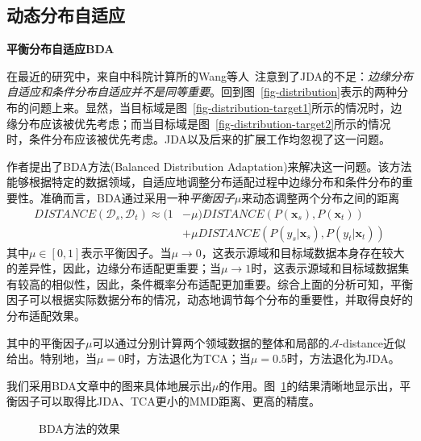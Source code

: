 \subsection{动态分布自适应}

\textbf{平衡分布自适应BDA}

在最近的研究中，来自中科院计算所的Wang等人~\cite{wang2017balanced}注意到了JDA的不足：\textit{边缘分布自适应和条件分布自适应并不是同等重要}。回到图~\ref{fig-distribution}表示的两种分布的问题上来。显然，当目标域是图~\ref{fig-distribution-target1}所示的情况时，边缘分布应该被优先考虑；而当目标域是图~\ref{fig-distribution-target2}所示的情况时，条件分布应该被优先考虑。JDA以及后来的扩展工作均忽视了这一问题。

作者提出了BDA方法(Balanced Distribution Adaptation)来解决这一问题。该方法能够根据特定的数据领域，自适应地调整分布适配过程中边缘分布和条件分布的重要性。准确而言，BDA通过采用一种\textit{平衡因子}$\mu$来动态调整两个分布之间的距离
\begin{equation}
\label{equ-mummd}
\begin{split}
DISTANCE(\mathcal{D}_s,\mathcal{D}_t) \approx  (1 &- \mu)DISTANCE(P(\mathbf{x}_s),P(\mathbf{x}_t))\\
&+ \mu DISTANCE(P(y_s|\mathbf{x}_s),P(y_t|\mathbf{x}_t))
\end{split}
\end{equation}
其中$\mu \in [0,1]$表示平衡因子。当$\mu \rightarrow 0$，这表示源域和目标域数据本身存在较大的差异性，因此，边缘分布适配更重要；当$\mu \rightarrow 1$时，这表示源域和目标域数据集有较高的相似性，因此，条件概率分布适配更加重要。综合上面的分析可知，平衡因子可以根据实际数据分布的情况，动态地调节每个分布的重要性，并取得良好的分布适配效果。

其中的平衡因子$\mu$可以通过分别计算两个领域数据的整体和局部的$\mathcal{A}$-distance近似给出。特别地，当$\mu = 0$时，方法退化为TCA；当$\mu = 0.5$时，方法退化为JDA。

我们采用BDA文章中的图来具体地展示出$\mu$的作用。图~\ref{fig-distribution-bda}的结果清晰地显示出，平衡因子可以取得比JDA、TCA更小的MMD距离、更高的精度。


\begin{figure}[h]
	\centering

	\caption{BDA方法的效果}
	\label{fig-distribution-bda}
\end{figure}


